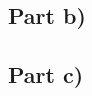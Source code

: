 \documentclass[20pt]{article}
\begin{document}
\subsection*{Part b)}

\subsection*{Part c)}

\section{}

\section{}

\section{}

\section{}

\section{}

\section{}
\end{document}
